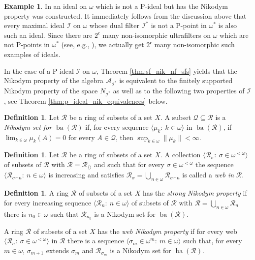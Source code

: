 \documentclass[a4paper,11pt,fleqn]{amsart}
\theoremstyle{definition}
\newtheorem{definition}[theorem]{Definition}
\newtheorem{example}[theorem]{Example}
\theoremstyle{remark}
\numberwithin{equation}{section}
\newcommand{\frakc}{\mathfrak{c}}
\newcommand{\N}{\mathbb{N}}
\newcommand{\aA}{\mathcal{A}}
\newcommand{\iI}{\mathcal{I}}
\newcommand{\qQ}{\mathcal{Q}}
\newcommand{\rR}{\mathcal{R}}
\DeclareMathOperator{\ba}{ba}
\newcommand{\concat}{{^\smallfrown}}
\newcommand{\sub}{\subseteq}
\newcommand{\seq}[2]{\big\langle#1\colon\ #2\big\rangle}
\newcommand{\seqn}[1]{\big\langle#1\colon\ n\io\big\rangle}
\newcommand{\seqk}[1]{\big\langle#1\colon\ k\io\big\rangle}
\newcommand{\seqm}[1]{\big\langle#1\colon\ m\io\big\rangle}
\newcommand{\io}{\in\omega}%
\begin{document}
\begin{example}\label{example:nonppoint_nikodym}
    In \cite[Example 5.6]{DP00} an ideal on $\omega$ which is not a P-ideal but has the Nikodym property was constructed. It immediately follows from the discussion above that every maximal ideal $\iI$ on $\omega$ whose dual filter $\iI^*$ is not a P-point in $\omega^*$ is also such an ideal. Since there are $2^\frakc$ many non-isomorphic ultrafilters on $\omega$ which are not P-points in $\omega^*$ (see, e.g., \cite[page 76]{Jec03}), we actually get $2^\frakc$ many non-isomorphic such examples of ideals.
\end{example}

In the case of a P-ideal $\iI$ on $\omega$, Theorem \ref{thm:sf_nik_nf_sfs} yields that the Nikodym property of the algebra $\aA_{\iI^*}$ is equivalent to the finitely supported Nikodym property of the space $N_{\iI^*}$ as well as to the following two properties of $\iI$, see Theorem \ref{thm:p_ideal_nik_equivalences} below.

\begin{definition}\label{def:nikodym_set}
Let $\rR$ be a ring of subsets of a set $X$. A subset $\qQ\sub\rR$ is a \textit{Nikodym set for $\ba(\rR)$} if, for every sequence $\seqk{\mu_k}$ in $\ba(\rR)$, if $\lim_{k\io}\mu_k(A)=0$ for every $A\in\qQ$, then $\sup_{k\io}\big\|\mu_k\big\|<\infty$. 
\end{definition}

\begin{definition}\label{def:web}
Let $\rR$ be a ring of subsets of a set $X$. A collection $\seq{\rR_\sigma}{\sigma\in\omega^{<\omega}}$ of subsets of $\rR$ with  $\rR=\rR_{\langle\rangle}$ and such that for every $\sigma\in\omega^{<\omega}$ the sequence $\seqn{\rR_{\sigma\concat n}}$ is increasing and satisfies $\rR_\sigma=\bigcup_{n\io}\rR_{\sigma\concat n}$ is called a \textit{web in} $\rR$.
\end{definition}

\begin{definition}\label{def:strong_web_nik}
A ring $\rR$ of subsets of a set $X$ has the \textit{strong Nikodym property} if for every increasing sequence $\seqn{\rR_n}$ of subsets of $\rR$ with $\rR=\bigcup_{n\io}\rR_n$ there is $n_0\io$ such that $\rR_{n_0}$ is a Nikodym set for $\ba(\rR)$.

A ring $\rR$ of subsets of a set $X$ has the \textit{web Nikodym property} if for every web $\seq{\rR_\sigma}{\sigma\in\omega^{<\omega}}$ in $\rR$ there is a sequence $\seqm{\sigma_m\in \omega^{m}}$ such that, for every $m\io$, $\sigma_{m+1}$ extends $\sigma_m$ and $\rR_{\sigma_m}$ is a Nikodym set for $\ba(\rR)$.
\end{definition}
\end{document}
